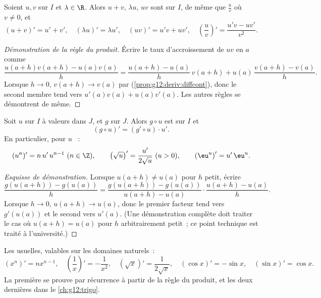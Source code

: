 \begin{proposition}[Opérations]\label{prop:g12:deriv:operations}
Soient $u, v$  sur $I$ et $\lambda \in \R$. Alors $u + v$,
$\lambda u$, $uv$ sont  sur $I$, de même que $\frac{u}{v}$ où
$v \neq 0$, et
\[
(u+v)' = u' + v', \quad (\lambda u)' = \lambda u', \quad
(uv)' = u'v + uv', \quad
\left(\frac{u}{v}\right)' = \frac{u'v - uv'}{v^2}.
\]
\end{proposition}

\begin{proof}[Démonstration de la règle du produit]
Écrire le taux d'accroissement de $uv$ en $a$ comme
\[
\frac{u(a+h)v(a+h) - u(a)v(a)}{h}
= \frac{u(a+h) - u(a)}{h}\,v(a+h) + u(a)\,\frac{v(a+h) - v(a)}{h}.
\]
Lorsque $h \to 0$, $v(a+h) \to v(a)$ par 
(\cref{prop:g12:deriv:diffcont}), donc le second membre tend vers
$u'(a)v(a) + u(a)v'(a)$. Les autres règles se démontrent de même.
\end{proof}

\begin{theorem}\label{thm:g12:deriv:chain}
Soit $u$  sur $I$ à valeurs dans $J$, et $g$  sur $J$.
Alors $g \circ u$ est  sur $I$ et
\[
(g \circ u)' = (g' \circ u) \cdot u' .
\]
En particulier, pour $u$ ~:
\[
(u^n)' = n\,u'\,u^{n-1} \ (n \in \Z), \qquad
\left(\sqrt{u}\right)' = \frac{u'}{2\sqrt{u}} \ (u > 0), \qquad
\left(\eu^{u}\right)' = u'\,\eu^{u}.
\]
\end{theorem}

\begin{proof}[Esquisse de démonstration]
Lorsque $u(a+h) \neq u(a)$ pour $h$ petit, écrire
\[
\frac{g(u(a+h)) - g(u(a))}{h}
= \frac{g(u(a+h)) - g(u(a))}{u(a+h) - u(a)} \cdot \frac{u(a+h) - u(a)}{h}.
\]
Lorsque $h \to 0$, $u(a+h) \to u(a)$, donc le premier facteur tend vers
$g'(u(a))$ et le second vers $u'(a)$. (Une démonstration complète doit
traiter le cas où $u(a+h) = u(a)$ pour $h$ arbitrairement petit~; ce point
technique est traité à l'université.)
\end{proof}

\begin{example}
Les  usuelles, valables sur les domaines naturels~:
\[
(x^n)' = nx^{n-1}, \quad
\left(\frac{1}{x}\right)' = -\frac{1}{x^2}, \quad
(\sqrt{x})' = \frac{1}{2\sqrt{x}}, \quad
(\cos x)' = -\sin x, \quad
(\sin x)' = \cos x .
\]
La première se prouve par récurrence à partir de la règle du produit, et les
deux dernières dans le \cref{ch:g12:trigo}.
\end{example}


